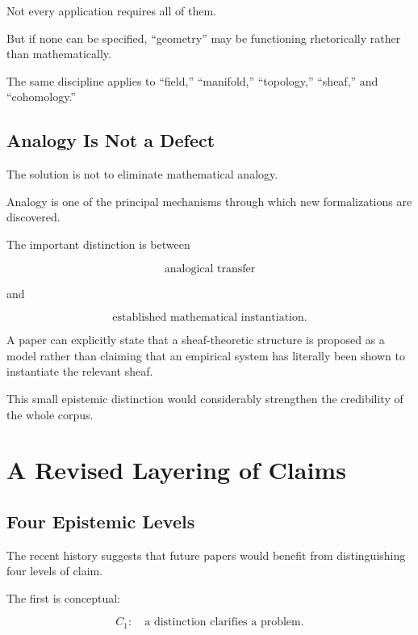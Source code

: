 \documentclass[11pt]{article}
\theoremstyle{remark}
\begin{document}
Not every application requires all of them.

But if none can be specified, ``geometry'' may be functioning rhetorically rather than mathematically.

The same discipline applies to ``field,'' ``manifold,'' ``topology,'' ``sheaf,'' and ``cohomology.''

\subsection{Analogy Is Not a Defect}

The solution is not to eliminate mathematical analogy.

Analogy is one of the principal mechanisms through which new formalizations are discovered.

The important distinction is between

\begin{equation}
\text{analogical transfer}
\end{equation}

and

\begin{equation}
\text{established mathematical instantiation}.
\end{equation}

A paper can explicitly state that a sheaf-theoretic structure is proposed as a model rather than claiming that an empirical system has literally been shown to instantiate the relevant sheaf.

This small epistemic distinction would considerably strengthen the credibility of the whole corpus.

\section{A Revised Layering of Claims}

\subsection{Four Epistemic Levels}

The recent history suggests that future papers would benefit from distinguishing four levels of claim.

The first is conceptual:

\begin{equation}
C_1:
\quad
\text{a distinction clarifies a problem}.
\end{equation}
\end{document}
